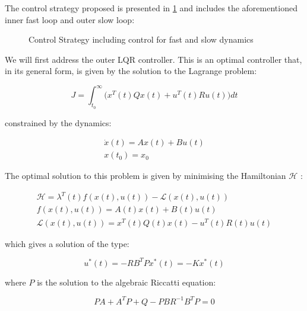 The control strategy proposed is presented in \cref{fig:tikzControlStrat} and includes the aforementioned inner fast loop and outer slow loop:  

\begin{figure}[h!]
	\centering
	\resizebox{\columnwidth}{!}{
	}
	\caption{Control Strategy including control for fast and slow dynamics}
	\label{fig:tikzControlStrat}
\end{figure}

We will first address the outer LQR controller. This is an optimal controller that, in its general form, is given by the solution to the Lagrange problem:

\begin{equation}\label{eq:LagrangeProblem}
		J = \int_{t_0}^{\infty} \big(x^T(t)Qx(t) + u^T(t)Ru(t)\big)dt
\end{equation} 

constrained by the dynamics:

\begin{equation}\label{eq:LQRDynamicsConstraint}
	\begin{gathered}
		\dot{x}(t) = Ax(t) + Bu(t) \\
		x(t_0) = x_0
	\end{gathered} 
\end{equation}

The optimal solution to this problem is given by minimising the Hamiltonian $\mathcal{H}$ \cite{Liberzon2012}:

\begin{equation}\label{eq:Hamiltonian}
	\begin{gathered}
			\mathcal{H} = \lambda^T(t) f(x(t),u(t)) - \mathcal{L}(x(t),u(t)) \\
			f(x(t),u(t)) = A(t)x(t) + B(t)u(t) \\
			\mathcal{L}(x(t),u(t)) =  x^T(t)Q(t)x(t) - u^T(t)R(t)u(t)
	\end{gathered}
\end{equation}

which gives a solution of the type:

\begin{equation}\label{eq:LQRSolution}
	u^*(t) = -RB^TPx^*(t) = -Kx^*(t)
\end{equation}

where $P$ is the solution to the algebraic Riccatti equation:

\begin{equation}\label{eq:ARE}
	PA + A^TP + Q - PBR^{-1}B^TP = 0
\end{equation}

